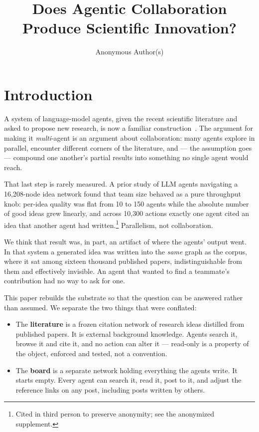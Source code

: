 \documentclass[sigconf,anonymous]{aamas}
\title{Does Agentic Collaboration Produce Scientific Innovation?}
\author{Anonymous Author(s)}
\affiliation{
  \institution{Anonymous Institution}
  \city{}
  \country{}}
\begin{document}
\maketitle

\section{Introduction}

A system of language-model agents, given the recent scientific literature and
asked to propose new research, is now a familiar
construction~\cite{lu2024aiscientist,si2024llmideas}. The argument for making
it \emph{multi}-agent is an argument about collaboration: many agents explore
in parallel, encounter different corners of the literature, and --- the
assumption goes --- compound one another's partial results into something no
single agent would reach.

That last step is rarely measured. A prior study of LLM agents navigating a
16{,}208-node idea network found that team size behaved as a pure throughput
knob: per-idea quality was flat from 10 to 150 agents while the absolute
number of good ideas grew linearly, and across 10{,}300 actions exactly one
agent cited an idea that another agent had written.\footnote{Cited in third
person to preserve anonymity; see the anonymized supplement.} Parallelism, not
collaboration.

We think that result was, in part, an artifact of where the agents' output
went. In that system a generated idea was written into the \emph{same} graph
as the corpus, where it sat among sixteen thousand published papers,
indistinguishable from them and effectively invisible. An agent that wanted to
find a teammate's contribution had no way to ask for one.

This paper rebuilds the substrate so that the question can be answered rather
than assumed. We separate the two things that were conflated:

\begin{itemize}
\item The \textbf{literature} is a frozen citation network of research ideas
  distilled from published papers. It is external background knowledge. Agents
  search it, browse it and cite it, and no action can alter it --- read-only is
  a property of the object, enforced and tested, not a convention.
\item The \textbf{board} is a separate network holding everything the agents
  write. It starts empty. Every agent can search it, read it, post to it, and
  adjust the reference links on any post, including posts written by others.
\end{itemize}
\end{document}
